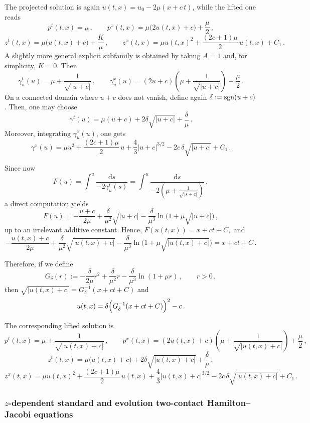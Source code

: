 \documentclass[11pt,twoside]{article}
\theoremstyle{plain}
\theoremstyle{definition}
\theoremstyle{remark}
\renewcommand{\d}{\mathrm{d}}
\begin{document}
The projected solution is again
\(
u(t,x)=u_0-2\mu(x+c\,t)
\),
while the lifted one reads
\[
p^t(t,x)=\mu\,,\qquad
p^x(t,x)=\mu\bigl(2u(t,x)+c\bigr)+\frac{\mu}{2}\,,
\]
\[
z^t(t,x)=\mu\bigl(u(t,x)+c\bigr)+\frac{K}{\mu}\,,\qquad
z^x(t,x)=\mu u(t,x)^2+\frac{(2c +1)\mu}{2}\,u(t,x)+C_1\,.
\]
A slightly more general explicit subfamily is obtained by taking $A=1$ and, for simplicity, $K=0$. Then
\[
\gamma_u^t(u)=\mu+\frac{1}{\sqrt{|u+c|}}\,,\qquad
\gamma_u^x(u)=(2u+c)\left(\mu+\frac{1}{\sqrt{|u+c|}}\right)+\frac{\mu}{2}\,.
\]
On a connected domain where $u+c$ does not vanish, define again $\delta:={\rm sgn}(u+c)$. Then, one may choose
\[
\gamma^t(u)=\mu(u+c)+2\delta\sqrt{|u+c|}+\frac{\delta}{\mu}\,.
\]
Moreover, integrating $\gamma_u^x(u)$, one gets
\[
\gamma^x(u)=\mu u^2+\frac{(2c+1)\mu}{2}\,u+\frac{4}{3}|u+c|^{3/2}-2c\,\delta\sqrt{|u+c|}+C_1\,.
\]

Since now
\[
F(u)=\int^u\frac{\d s}{-2\gamma_u^t(s)}
=\int^u\frac{\d s}{-2\left(\mu+\frac{1}{\sqrt{|s+c|}}\right)}\,,
\]
a direct computation yields
\[
F(u)=-\frac{u+c}{2\mu}+\frac{\delta}{\mu^2}\sqrt{|u+c|}-\frac{\delta}{\mu^3}\ln\!\bigl(1+\mu\sqrt{|u+c|}\bigr)\,,
\]
up to an irrelevant additive constant. Hence,  
\(
F(u(t,x))=x+ct+C,
\)
and 
\[
-\frac{u(t,x)+c}{2\mu}+\frac{\delta}{\mu^2}\sqrt{|u(t,x)+c|}-\frac{\delta}{\mu^3}
\ln\!\bigl(1+\mu\sqrt{|u(t,x)+c|}\bigr)=x+ct+C\,.
\]

Therefore, if we define
\[
G_\delta(r):=-\frac{\delta}{2\mu}r^2+\frac{\delta}{\mu^2}r-\frac{\delta}{\mu^3}\ln(1+\mu r)\,,\qquad r>0\,,
\]
then $\sqrt{|u(t,x)+c|}=G_\delta^{-1}(x+ct+C)$ and
\[
u(t,x)=\delta\Bigl(G_\delta^{-1}(x+ct+C)\Bigr)^2-c\,.
\]

The corresponding lifted solution is
\[
p^t(t,x)=\mu+\frac{1}{\sqrt{|u(t,x)+c|}}\,,
\qquad  p^x(t,x)=(2u(t,x)+c)\left(\mu+\frac{1}{\sqrt{|u(t,x)+c|}}\right)+\frac{\mu}{2}\,,
\]
\[
z^t(t,x)=\mu\bigl(u(t,x)+c\bigr)+2\delta\sqrt{|u(t,x)+c|}+\frac{\delta}{\mu}\,,
\]
\[
z^x(t,x)=\mu u(t,x)^2+\frac{(2c+1)\mu}{2}\,u(t,x)+\frac{4}{3}|u(t,x)+c|^{3/2}
-2c\,\delta\sqrt{|u(t,x)+c|}+C_1\,.
\]



\subsubsection{\texorpdfstring{$z$}{}-dependent standard and evolution two-contact Hamilton--Jacobi equations}
\end{document}

